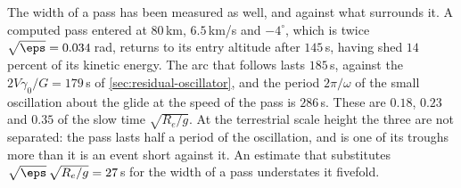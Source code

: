 The width of a pass has been measured as well, and against what surrounds
it. A computed pass entered at $80$\,km, $6.5$\,km/s and $-4^\circ$, which
is twice $\sqrt{\eps} = 0.034$\,rad, returns to its entry altitude after
$145$\,s, having shed $14$ percent of its kinetic energy. The arc that
follows lasts $185$\,s, against the $2V\gamma_0/G = 179$\,s of
\cref{sec:residual-oscillator}, and the period $2\pi/\omega$ of the small
oscillation about the glide at the speed of the pass is $286$\,s. These are
$0.18$, $0.23$ and $0.35$ of the slow time $\sqrt{R_e/g}$. At the
terrestrial scale height the three are not separated: the pass lasts half a
period of the oscillation, and is one of its troughs more than it is an
event short against it. An estimate that substitutes
$\sqrt{\eps}\,\sqrt{R_e/g} = 27$\,s for the width of a pass understates it
fivefold.

